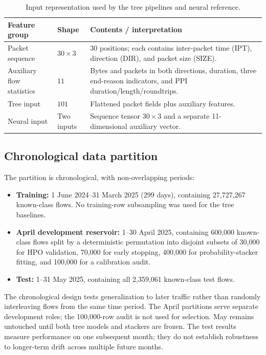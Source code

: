 \documentclass[conference]{IEEEtran}
\begin{document}
\begin{table}[t]
\centering
\caption{Input representation used by the tree pipelines and neural reference.}
\label{tab:feature_schema}
\small
\begin{tabular}{p{}p{}p{}}
\toprule
Feature group & Shape & Contents / interpretation \\
\midrule
Packet sequence & $30\times3$ & 30 positions; each contains inter-packet time (IPT), direction (DIR), and packet size (SIZE). \\
Auxiliary flow statistics & $11$ & Bytes and packets in both directions, duration, three end-reason indicators, and PPI duration/length/roundtrips. \\
Tree input & $101$ & Flattened packet fields plus auxiliary features. \\
Neural input & Two inputs & Sequence tensor $30\times3$ and a separate 11-dimensional auxiliary vector. \\
\bottomrule
\end{tabular}
\end{table}

\subsection{Chronological data partition}

The partition is chronological, with non-overlapping periods:
\begin{itemize}
  \item \textbf{Training:} 1 June 2024--31 March 2025 (299 days), containing 27{,}727{,}267 known-class flows. No training-row subsampling was used for the tree baselines.
  \item \textbf{April development reservoir:} 1--30 April 2025, containing 600{,}000 known-class flows split by a deterministic permutation into disjoint subsets of 30{,}000 for HPO validation, 70{,}000 for early stopping, 400{,}000 for probability-stacker fitting, and 100{,}000 for a calibration audit.
  \item \textbf{Test:} 1--31 May 2025, containing all 2{,}359{,}061 known-class test flows.
\end{itemize}

The chronological design tests generalization to later traffic rather than randomly interleaving flows from the same time period. The April partitions serve separate development roles; the 100,000-row audit is not used for selection. May remains untouched until both tree models and stackers are frozen. The test results measure performance on one subsequent month; they do not establish robustness to longer-term drift across multiple future months.
\end{document}
